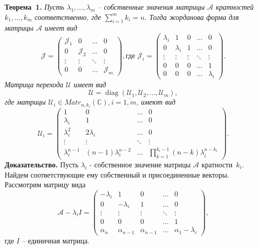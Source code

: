 \textbf{Теорема~1.}
{ \it Пусть $\lambda_1, \ldots , \lambda_m$ -- собственные значения матрицы $\mathcal{A}$ кратностей $k_1, \ldots , k_m$ соответственно, где $\sum\limits_{i=1}^m k_i = n$. Тогда жорданова форма для матрицы $\mathcal{A}$ имеет вид
$$
	\mathcal{J} = \begin{pmatrix}
		\mathcal{J}_1 & 0 & \dots & 0 \\
		0 & \mathcal{J}_2 & \dots & 0 \\
		\vdots & \vdots & \ddots & \vdots \\
		0 & 0 & \dots & \mathcal{J}_m
	\end{pmatrix}, {\text{где }}
	\mathcal{J}_i = \begin{pmatrix}
		\lambda_i & 1 & 0 & \dots & 0 \\
		0 & \lambda_i & 1 & \dots & 0 \\
		\vdots & \vdots & \vdots & \ddots & \vdots \\
		0 & 0 & 0 & \dots & 1 \\
		0 & 0 & 0 & \dots & \lambda_i
	\end{pmatrix}.
$$
Матрица перехода $\mathcal{U}$ имеет вид
$$
\mathcal{U} = \operatorname{diag} \left( \mathcal{U}_1, \mathcal{U}_2, \dots, \mathcal{U}_m \right),
$$
где матрицы $\mathcal{U}_i \in Matr_{n,k_i} (\mathbb{C}) , i= \overline{1,m}$, имеют вид
$$
\mathcal{U}_i = \begin{pmatrix}
1 & 0 & \dots & 0 \\
\lambda_i & 1 & \dots & 0 \\ 
\lambda_i^2 & 2\lambda_i & \dots & 0 \\
\vdots & \vdots & \ddots & \vdots \\
\lambda_i^{n-1} & (n-1)\lambda_i^{n-2} & \dots & \prod_{k=1}^{k_i-1}(n-k)\lambda_i^{n-k_i}
\end{pmatrix}.
$$
}
\textbf{Доказательство.} Пусть $\lambda_i$ - собственное значение матрицы $\mathcal{A}$ кратности~$k_i$. Найдем соответствующие ему собственный и присоединенные векторы. Рассмотрим матрицу вида
$$
\mathcal{A}-\lambda_i I = 
\begin{pmatrix}
	-\lambda_i & 1 & 0 & \dots & 0 \\
	0 & -\lambda_i & 1 & \dots & 0 \\
	\vdots & \vdots & \vdots & \ddots & \vdots \\
	0 & 0 & 0 & \dots & 1 \\
	\alpha_n & \alpha_{n-1} & \alpha_{n-1} & \dots & \alpha_1-\lambda_i
\end{pmatrix},
$$ 
где $I$ -- единичная матрица.\\
